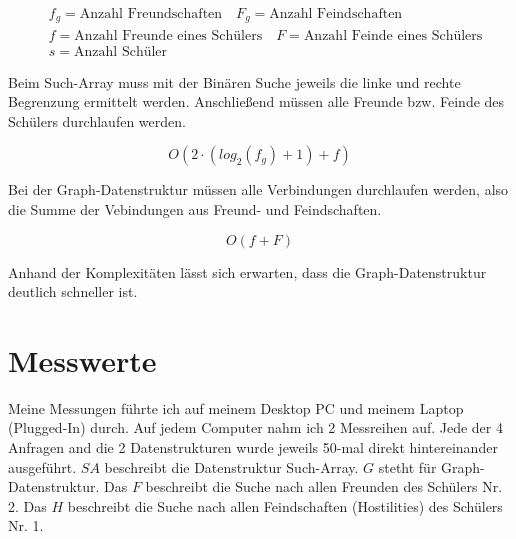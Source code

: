 \documentclass[11pt,a4paper]{article}
\begin{document}
\begin{align*}
    & f_g = \text{Anzahl Freundschaften} \quad
    F_g = \text{Anzahl Feindschaften} \\ 
    & f = \text{Anzahl Freunde eines Schülers} \quad
    F = \text{Anzahl Feinde eines Schülers} \\
    & s = \text{Anzahl Schüler} \quad
\end{align*}

Beim Such-Array muss mit der Binären Suche jeweils die linke und rechte Begrenzung
ermittelt werden. Anschließend müssen alle Freunde bzw. Feinde des
Schülers durchlaufen werden.

\begin{equation*}
    O(2 \cdot ( log_2(f_g) + 1 ) + f)
\end{equation*}

Bei der Graph-Datenstruktur müssen alle Verbindungen durchlaufen werden, also
die Summe der Vebindungen aus Freund- und Feindschaften.

\begin{equation*}
    O(f + F)
\end{equation*}

Anhand der Komplexitäten lässt sich erwarten, dass die Graph-Datenstruktur deutlich
schneller ist.

\section{Messwerte}

Meine Messungen führte ich auf meinem Desktop PC und meinem Laptop (Plugged-In) durch.
Auf jedem Computer nahm ich 2 Messreihen auf.
Jede der 4 Anfragen and die 2 Datenstrukturen wurde jeweils 50-mal direkt hintereinander
ausgeführt.
$SA$ beschreibt die Datenstruktur Such-Array. $G$ stetht für Graph-Datenstruktur.
Das $F$ beschreibt die Suche nach allen Freunden des Schülers Nr. 2.
Das $H$ beschreibt die Suche nach allen Feindschaften (Hostilities) des Schülers Nr. 1.

\end{document}
